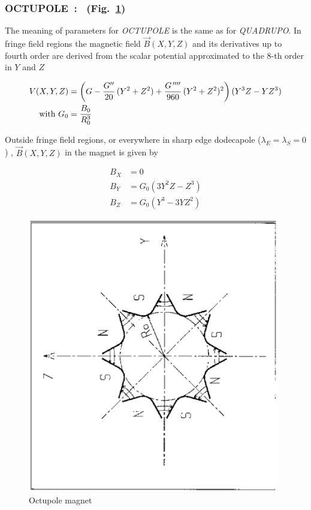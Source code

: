 \newpage

\subsubsection*{OCTUPOLE~: \OCTUPOLETitl\  (Fig.~\protect\ref{fig24}) } \label{OCTUPOLE}

 The meaning of parameters for \textsl{OCTUPOLE}  is the same as for 
\textsl{QUADRUPO}.  In fringe field regions the magnetic field $ \vec  B(X,Y,Z)$ and 
its derivatives up to fourth order are derived from the scalar potential 
approximated to the 8-th order in $ Y $ and $ Z $

\begin{align*}
	V(X,Y,Z) &   =   \left(G-\dfrac{G^{\prime\prime} }{ 20} \, (Y^2+Z^2)+
	              \dfrac{G^{\,\prime\prime\prime\prime} }{ 960}\, (Y^2+Z^2)^2 \right) (Y^3Z-YZ^3)   \\
	\text{with } G_0 &   =  \dfrac{ B_0 }{ R^3_0} 
\end{align*}

\noindent Outside fringe field regions, or everywhere in sharp edge dodecapole
($ \lambda_ E=\lambda_ S=0$) , $ \vec  B(X,Y,Z) $ in the magnet is given by 

\begin{align*}
	B_X &   =   0 \\
	B_Y &   =   G_0(3Y^2Z-Z^3)  \\
	B_Z &   = G_0(Y^3-3YZ^2)    
\end{align*}
\vfill

\begin{figure}[H]
\centerline{\includegraphics[height=12cm,angle=-90]{Fig24.ps}}
\caption{\label{fig24}Octupole magnet}
\end{figure}
\vfill

